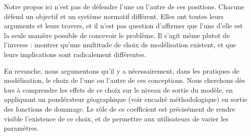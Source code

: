 Notre propos ici n'est pas de défendre l'une ou l'autre de ces positions. Chacune défend un objectif et un système normatif différent. Elles ont toutes leurs arguments et leurs travers, et il n'est pas question d'affirmer que l'une d'elle est la seule manière possible de concevoir le problème. Il s'agit même plutot de l'inverse : montrer qu'une multitude de choix de modélisation existent, et que leurs implications sont radicalement différentes. 

En revanche, nous argumentons qu'il y a nécessairement, dans les pratiques de modélisation, le choix de l'une ou l'autre de ces conceptions.  Nous cherchons dès lors à comprendre les effets de ce choix sur le niveau de sortie du modèle, en appliquant un pondérateur géographique (voir encadré méthodologique) en sortie des fonctions de dommage. Le rôle de ce coefficient est précisément de  rendre visible l'existence de ce choix, et de permettre aux utilisateurs de varier les paramètres. 

